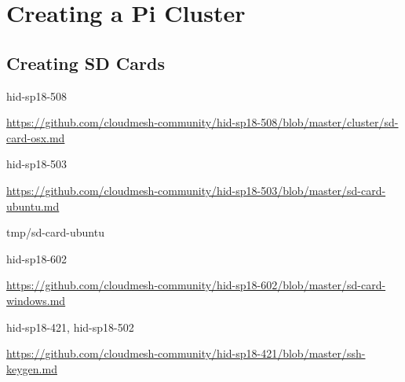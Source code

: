 \chapter{Creating a Pi Cluster}

\section{Creating SD Cards}


\begin{IU}

hid-sp18-508

\url{https://github.com/cloudmesh-community/hid-sp18-508/blob/master/cluster/sd-card-osx.md}

\end{IU}



\begin{IU}

  hid-sp18-503 

  \url{https://github.com/cloudmesh-community/hid-sp18-503/blob/master/sd-card-ubuntu.md}

\end{IU}

 {tmp/sd-card-ubuntu}


\begin{IU}

  hid-sp18-602

  \url{https://github.com/cloudmesh-community/hid-sp18-602/blob/master/sd-card-windows.md}

\end{IU}




\begin{IU}

hid-sp18-421, hid-sp18-502

\url{https://github.com/cloudmesh-community/hid-sp18-421/blob/master/ssh-keygen.md}

\end{IU}



